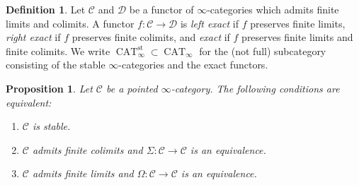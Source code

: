 \documentclass[12pt]{article}
\newtheorem{proposition}{Proposition}[subsection]
\theoremstyle{definition}
\newtheorem{definition}{Definition}[subsection]
\newcommand{\C}{\mathcal{C}}
\newcommand{\D}{\mathcal{D}}
\renewcommand{\i}{\infty}
\DeclareMathOperator{\CAT}{CAT}
\newcommand{\st}{\mathrm{st}}
\begin{document}
\begin{definition}
Let $\C$ and $\D$ be a functor of $\i$-categories which admits finite limits and colimits.
A functor $f:\C\to\D$ is {\em left exact} if $f$ preserves finite limits, {\em right exact} if $f$ preserves finite colimits, and {\em exact} if $f$ preserves finite limits and finite colimits.
We write $\CAT_\i^{\st}\subset\CAT_\i$ for the (not full) subcategory consisting of the stable $\i$-categories and the exact functors.
\end{definition}
\begin{proposition}{\em \cite[Corollary 1.4.2.11]{HA}}
Let $\C$ be a pointed $\i$-category.
The following conditions are equivalent:
\begin{enumerate}\itemsep.1em
\item[\emph{(1)}]
$\C$ is stable.
\item[\emph{(2)}]
$\C$ admits finite colimits and $\Sigma:\C\to\C$ is an equivalence.
\item[\emph{(3)}]
$\C$ admits finite limits and $\Omega:\C\to\C$ is an equivalence.
\end{enumerate}
\end{proposition}
\end{document}
